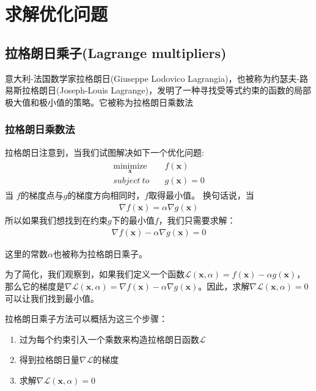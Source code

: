 \chapter{求解优化问题}

\section{拉格朗日乘子(Lagrange multipliers)}

意大利-法国数学家拉格朗日(Giuseppe Lodovico Lagrangia)，也被称为约瑟夫-路易斯拉格朗日(Joseph-Louis Lagrange)，发明了一种寻找受等式约束的函数的局部极大值和极小值的策略。它被称为拉格朗日乘数法

\subsection{拉格朗日乘数法}

拉格朗日注意到，当我们试图解决如下一个优化问题:
\begin{gather*}
\begin{align*}
\underset{\mathbf{x}}{\text{minimize}} \quad &f(\mathbf{x}) \\
subject\ to\quad & g(\mathbf{x})=0
\end{align*}
\end{gather*}
当 $f$的梯度点与$g$的梯度方向相同时，$f$取得最小值。 换句话说，当
\begin{gather*}
\nabla f(\mathbf{x}) = \alpha \nabla g(\mathbf{x})
\end{gather*}
所以如果我们想找到在约束$g$下的最小值$f$，我们只需要求解：
\begin{gather*}
\nabla f(\mathbf{x}) - \alpha \nabla g(\mathbf{x}) = 0
\end{gather*}

这里的常数$\alpha$也被称为拉格朗日乘子。

为了简化，我们观察到，如果我们定义一个函数$\mathcal{L}(\mathbf{x},\alpha)=f(\mathbf{x})-\alpha g(\mathbf{x})$，那么它的梯度是$\nabla\mathcal{L}(\mathbf{x},\alpha)=\nabla f(\mathbf{x})-\alpha \nabla g(\mathbf{x})$。因此，求解$\nabla\mathcal{L}(\mathbf{x},\alpha)=0$可以让我们找到最小值。


拉格朗日乘子方法可以概括为这三个步骤：
\begin{enumerate}
    \item 过为每个约束引入一个乘数来构造拉格朗日函数$\mathcal{L}$
    \item 得到拉格朗日量$\nabla \mathcal{L}$的梯度
    \item 求解$\nabla\mathcal{L}(\mathbf{x},\alpha)=0$
\end{enumerate}

